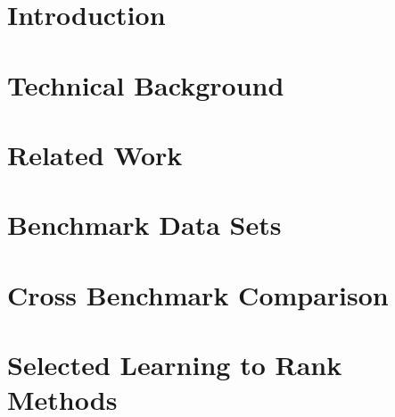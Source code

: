 



\frenchspacing
\raggedbottom
{} %
\pagestyle{plain}




\pagestyle{scrheadings}
\cleardoublepage
\cleardoublepage
\chapter{Introduction}
 
\chapter{Technical Background}
\acresetall

\chapter{Related Work}
\acresetall

\chapter{Benchmark Data Sets}
\acresetall

\chapter{Cross Benchmark Comparison}
\acresetall

\chapter{Selected Learning to Rank Methods}
\acresetall

